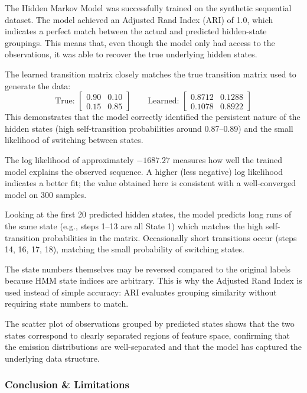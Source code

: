 \documentclass[a4paper,11pt]{article}
\begin{document}
\begin{itemize}
The Hidden Markov Model was successfully trained on the synthetic sequential dataset. The model achieved an Adjusted Rand Index (ARI) of 1.0, which indicates a perfect match between the actual and predicted hidden-state groupings. This means that, even though the model only had access to the observations, it was able to recover the true underlying hidden states.

The learned transition matrix closely matches the true transition matrix used to generate the data:
\[
\text{True: } \begin{bmatrix} 0.90 & 0.10 \\ 0.15 & 0.85 \end{bmatrix}
\qquad
\text{Learned: } \begin{bmatrix} 0.8712 & 0.1288 \\ 0.1078 & 0.8922 \end{bmatrix}
\]
This demonstrates that the model correctly identified the persistent nature of the hidden states (high self-transition probabilities around 0.87--0.89) and the small likelihood of switching between states.

The log likelihood of approximately $-1687.27$ measures how well the trained model explains the observed sequence. A higher (less negative) log likelihood indicates a better fit; the value obtained here is consistent with a well-converged model on 300 samples.

Looking at the first 20 predicted hidden states, the model predicts long runs of the same state (e.g., steps 1--13 are all State 1) which matches the high self-transition probabilities in the matrix. Occasionally short transitions occur (steps 14, 16, 17, 18), matching the small probability of switching states.

The state numbers themselves may be reversed compared to the original labels because HMM state indices are arbitrary. This is why the Adjusted Rand Index is used instead of simple accuracy: ARI evaluates grouping similarity without requiring state numbers to match.

The scatter plot of observations grouped by predicted states shows that the two states correspond to clearly separated regions of feature space, confirming that the emission distributions are well-separated and that the model has captured the underlying data structure.

\subsubsection{Conclusion \& Limitations}


\end{itemize}
\end{document}
